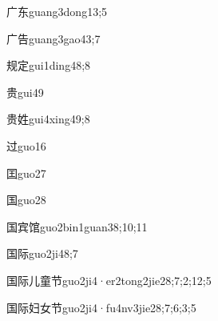 \begin{verbete}{广东}{guang3dong1}{3;5}
\end{verbete}

\begin{verbete}{广告}{guang3gao4}{3;7}
\end{verbete}

\begin{verbete}{规定}{gui1ding4}{8;8}
\end{verbete}

\begin{verbete}{贵}{gui4}{9}
\end{verbete}

\begin{verbete}{贵姓}{gui4xing4}{9;8}
\end{verbete}

\begin{verbete}{过}{guo1}{6}
\end{verbete}

\begin{verbete}{囯}{guo2}{7}
\end{verbete}

\begin{verbete}{国}{guo2}{8}
\end{verbete}

\begin{verbete}{国宾馆}{guo2bin1guan3}{8;10;11}
\end{verbete}

\begin{verbete}{国际}{guo2ji4}{8;7}
\end{verbete}

\begin{verbete}{国际儿童节}{guo2ji4·er2tong2jie2}{8;7;2;12;5}
\end{verbete}

\begin{verbete}{国际妇女节}{guo2ji4·fu4nv3jie2}{8;7;6;3;5}
\end{verbete}


